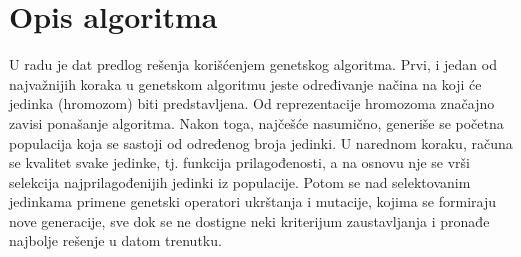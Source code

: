 \documentclass[12pt]{article}
\begin{document}
	\vspace*{3\baselineskip}
	\section{Opis algoritma}
	\label{sec:prvoPoglavlje}
	\par U radu je dat predlog rešenja korišćenjem genetskog algoritma. Prvi, i jedan od najvažnijih koraka u genetskom algoritmu jeste određivanje načina na koji 
	će jedinka (hromozom) biti predstavljena. Od reprezentacije hromozoma značajno zavisi ponašanje algoritma. Nakon toga, najčešće nasumično, generiše se početna populacija koja se sastoji od određenog broja jedinki. U narednom koraku, računa se kvalitet svake jedinke, tj. funkcija prilagođenosti, a na osnovu nje se vrši selekcija najprilagođenijih jedinki iz populacije. Potom se nad selektovanim jedinkama primene genetski operatori ukrštanja i mutacije, kojima se formiraju nove generacije, sve dok se ne dostigne neki kriterijum zaustavljanja i pronađe najbolje rešenje u datom trenutku.
	
\end{document}
